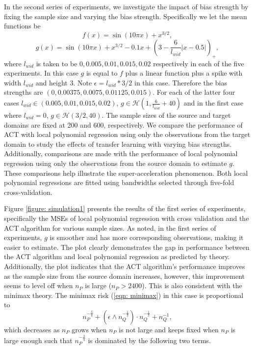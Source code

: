 \documentclass{article}
\def\H{\mathcal{H}}
\begin{document}
In the second series of experiments, we investigate the impact of bias strength by fixing the sample size and varying the bias strength. 
Specifically we let the mean functions be 
$$f(x)=\sin(10\pi x)+x^{3/2},$$
$$g(x)=\sin(10\pi x)+x^{3/2}-0.1x+(3-\frac{6}{l_{wid}}|x-0.5|)_+, $$
where $l_{wid}$ is taken to be $0,0.005,0.01,0.015, 0.02$ respectively in each of the five experiments. In this case $g$ is equal to $f$ plus a linear function plus a spike with width $l_{wid}$ and height $3$. Note $\epsilon=l_{wid}*3/2$ in this case. Therefore the bias strengths are $(0,0.00375,0.0075,0.01125,0.015)$. For each of the latter four cases $l_{wid}\in (0.005,0.01,0.015, 0.02)$, $g\in \H(1,\frac{6}{l_{wid}}+40)$ and in the first case where $l_{wid}=0$, $g\in \H(3/2,40)$. 
The sample sizes of the source and target domains are fixed at 200 and 600, respectively. We compare the performance of ACT with local polynomial regression using only the observations from the target domain to study the effects of transfer learning with varying bias strengths. Additionally, comparisons are made with the performance of local polynomial regression using only the observations from the source domain to estimate $g$. These comparisons help illustrate the super-acceleration phenomenon. Both local polynomial regressions are fitted using bandwidths selected through five-fold cross-validation.

Figure \ref{figure: simulation1} presents the results of the first series of experiments, specifically the MSEs of local polynomial regression with cross validation and the ACT algorithm for various sample sizes. As noted, in the first series of experiments, $g$ is smoother and has more corresponding observations, making it easier to estimate. The plot clearly demonstrates the gap in performance between the ACT algorithm and local polynomial regression as predicted by theory. Additionally, the plot indicates that the ACT algorithm's performance improves as the sample size from the source domain increases, however, this improvement seems to level off when $n_P$ is large  ($n_P>2400$).
This is also consistent with the minimax theory. The minimax risk (\ref{eqn: minimax}) in this case is proportional to $$n_P^{-\frac{3}{4}}+(\epsilon\wedge n_Q^{-\frac{1}{3}})\cdot n_Q^{-\frac{1}{3}}+n_Q^{-1},$$
which decreases as $n_P$ grows when $n_P$   is not large and keeps fixed when $n_P$ is large enough such that  $n_P^{-\frac{3}{4}}$ is dominated by the following two terms.
\end{document}
